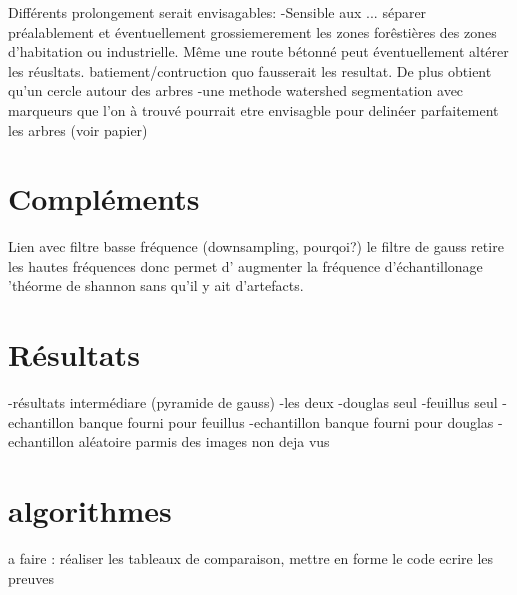 \documentclass{article}
\begin{document}
	Différents prolongement serait envisagables: 
	-Sensible aux ... séparer préalablement et éventuellement grossiemerement les zones forêstières des zones d'habitation ou  industrielle. Même une route bétonné peut éventuellement altérer les réusltats. batiement/contruction quo fausserait les resultat. 
	De plus obtient qu'un cercle autour des arbres
	-une methode watershed segmentation avec marqueurs que l'on à trouvé pourrait etre envisagble pour delinéer parfaitement les arbres (voir papier) 

\nocite{NatesanResNet} %



\appendix

	\section{Compléments}
		Lien avec filtre basse fréquence (downsampling, pourqoi?)
		le filtre de gauss retire les hautes fréquences donc permet d' augmenter la fréquence d'échantillonage 'théorme de shannon sans qu'il y ait d'artefacts. 
	
	\section{Résultats}	
		-résultats intermédiare (pyramide de gauss)
		-les deux 
		-douglas seul 
		-feuillus seul
		-echantillon banque fourni pour feuillus
		-echantillon banque fourni pour douglas 
		-echantillon aléatoire parmis des images non deja vus
	
	\section{algorithmes}


a faire : réaliser les tableaux de comparaison, mettre en forme le code 
ecrire les preuves 
\end{document}
